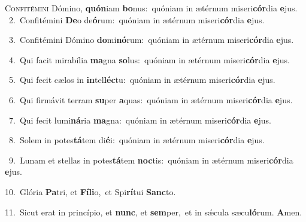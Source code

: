 \lettrine{\initial\textcolor{\initialcolor}{C}}{onfitémini} Dómino, \textbf{quón}\-iam \textbf{bo}\-nus:~\star quóniam in ætérnum miseri\-\textbf{cór}\-dia \textbf{e}\-jus.\\
{\numbfont\textcolor{\numbcolor}{~2.}}~Confitémini \textbf{De}\-o de\-\textbf{ó}\-rum:~\star quóniam in ætérnum miseri\-\textbf{cór}\-dia \textbf{e}\-jus.\par
{\numbfont\textcolor{\numbcolor}{~3.}}~Confitémini Dómino \textbf{do}\-mi\-\textbf{nó}\-rum:~\star quóniam in ætérnum miseri\-\textbf{cór}\-dia \textbf{e}\-jus.\par
{\numbfont\textcolor{\numbcolor}{~4.}}~Qui facit mirabília \textbf{ma}\-gna \textbf{so}\-lus:~\star quóniam in ætérnum miseri\-\textbf{cór}\-dia \textbf{e}\-jus.\par
{\numbfont\textcolor{\numbcolor}{~5.}}~Qui fecit cælos in \textbf{in}\-tel\-\textbf{léc}\-tu:~\star quóniam in ætérnum miseri\-\textbf{cór}\-dia \textbf{e}\-jus.\par
{\numbfont\textcolor{\numbcolor}{~6.}}~Qui firmávit terram \textbf{su}\-per \textbf{a}\-quas:~\star quóniam in ætérnum miseri\-\textbf{cór}\-dia \textbf{e}\-jus.\par
{\numbfont\textcolor{\numbcolor}{~7.}}~Qui fecit lumi\-\textbf{ná}\-ria \textbf{ma}\-gna:~\star quóniam in ætérnum miseri\-\textbf{cór}\-dia \textbf{e}\-jus.\par
{\numbfont\textcolor{\numbcolor}{~8.}}~Solem in potes\-\textbf{tá}\-tem di\-\textbf{é}\-i:~\star quóniam in ætérnum miseri\-\textbf{cór}\-dia \textbf{e}\-jus.\par
{\numbfont\textcolor{\numbcolor}{~9.}}~Lunam et stellas in potes\-\textbf{tá}\-tem \textbf{noc}\-tis:~\star quóniam in ætérnum miseri\-\textbf{cór}\-dia \textbf{e}\-jus.\par
{\numbfont\textcolor{\numbcolor}{10.}}~Glória \textbf{Pa}\-tri, et \textbf{Fí}\-\textbf{li}o,~\star et Spi\-\textbf{rí}\-tui \textbf{Sanc}\-to.\par
{\numbfont\textcolor{\numbcolor}{11.}}~Sicut erat in princípio, et \textbf{nunc}\-, et \textbf{sem}\-per,~\star et in sǽcula sæcu\-\textbf{ló}\-rum. \textbf{A}\-men.\par
